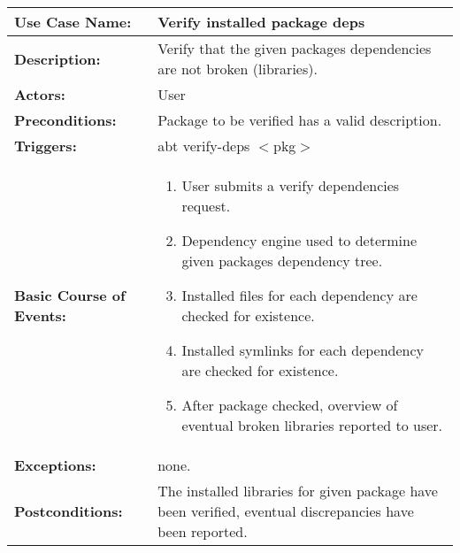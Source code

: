 
\begin{tabularx}{\linewidth}{|l|X|}
\hline
\textbf{Use Case Name:} & \textbf{Verify installed package deps} \\
\hline
\textbf{Description:} & 
Verify that the given packages dependencies are not broken (libraries).
\\
\hline
\textbf{Actors:} & User \\
\hline
\textbf{Preconditions:} & Package to be verified has a valid description. \\
\hline
\textbf{Triggers:} & abt verify-deps $<$pkg$>$ \\
\hline
\textbf{Basic Course of Events:} & 
\begin{minipage}{\linewidth} 
  \vspace{0.05em}
  \begin{enumerate}
    \item User submits a verify dependencies request.
    \item Dependency engine used to determine given packages dependency tree.
    \item Installed files for each dependency are checked for existence.
    \item Installed symlinks for each dependency are checked for existence.
    \item After package checked, overview of eventual broken libraries reported to user.
  \end{enumerate}
  \vspace{0.05em}
\end{minipage}
\\
\hline 
\textbf{Exceptions:} & none. \\
\hline 
\textbf{Postconditions:} &
The installed libraries for given package have been verified, eventual discrepancies have been reported. \\
\hline
\end{tabularx}


